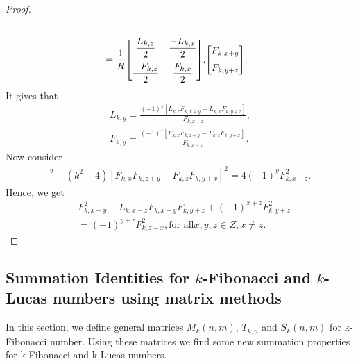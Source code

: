 \begin{proof}
\begin{align*}
{	}\\
	&=\dfrac{1}{R}{
 \begin{bmatrix}{}
    \dfrac{L_{k,z}}{2} & \dfrac{-L_{k,x}}{2} \vspace{.2cm}\\
    \dfrac{-F_{k,z}}{2} & \dfrac{F_{k,x}}{2} \\
	\end{bmatrix}
	}.{
 \begin{bmatrix}{}
    F_{k,x+y} \vspace{.2cm}\\
    F_{k,y+z} \\
	\end{bmatrix}
	}.	
	\end{align*}
	It gives that
	\begin{align*}
	L_{k,y}=\frac{(-1)^z[L_{k,z}F_{k,x+y}-L_{k,x}F_{k,y+z}]}{F_{k,x-z}},\\
	F_{k,y}=\frac{(-1)^z[F_{k,x}F_{k,z+y}-F_{k,z}F_{k,y+x}]}{F_{k,x-z}}.
	\end{align*}
	Now consider
	\begin{align*}
	[L_{k,z}F_{k,x+y}-L_{k,x}F_{k,y+z}]^2-(k^2+4)[F_{k,x}F_{k,z+y}-F_{k,z}F_{k,y+x}]^2=4(-1)^yF^2_{k,x-z}.
	\end{align*}
Hence, we get 
\begin{align*}
&F^2_{k,x+y}-L_{k,x-z}F_{k,x+y}F_{k,y+z}+(-1)^{x+z}F^2_{k,y+z}\\&=(-1)^{y+z}F^2_{k,z-x}, \text{for all} x,y,z\in Z, x\neq z.
\end{align*}

\end{proof}
\subsection{Summation Identities for $k$-Fibonacci and $k$-Lucas numbers using matrix methods}
In this section, we define general matrices $M_{k}(n,m)$, $T_{k,n}$ and $S_{k}{(n,m)}$ for k-Fibonacci number. Using these matrices we find some new summation properties for k-Fibonacci and k-Lucas numbers. 
